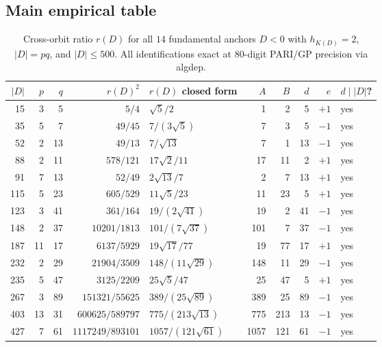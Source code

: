 \documentclass[11pt]{amsart}
\theoremstyle{definition}
\theoremstyle{remark}
\begin{document}
\subsection{Main empirical table}\label{ssec:main-table}

\begin{table}[H]
\centering
\caption{Cross-orbit ratio \(r(D)\) for all \(14\) fundamental
anchors \(D < 0\) with \(h_{K(D)} = 2\), \(|D| = pq\), and
\(|D| \le 500\). All identifications exact at \(80\)-digit
PARI/GP precision via \textsf{algdep}.}\label{tab:main}
\begin{tabular}{rrrrlrrrrl}
\toprule
\(|D|\) & \(p\) & \(q\) & \(r(D)^{2}\) & \(r(D)\) closed form & \(A\) & \(B\) & \(d\) & \(e\) & \(d \mid |D|\)? \\
\midrule
15  & 3  & 5  & \(5/4\)            & \(\sqrt{5}/2\)            & 1    & 2   & 5  & \(+1\) & yes \\
35  & 5  & 7  & \(49/45\)          & \(7/(3\sqrt{5})\)         & 7    & 3   & 5  & \(-1\) & yes \\
52  & 2  & 13 & \(49/13\)          & \(7/\sqrt{13}\)           & 7    & 1   & 13 & \(-1\) & yes \\
88  & 2  & 11 & \(578/121\)        & \(17\sqrt{2}/11\)         & 17   & 11  & 2  & \(+1\) & yes \\
91  & 7  & 13 & \(52/49\)          & \(2\sqrt{13}/7\)          & 2    & 7   & 13 & \(+1\) & yes \\
115 & 5  & 23 & \(605/529\)        & \(11\sqrt{5}/23\)         & 11   & 23  & 5  & \(+1\) & yes \\
123 & 3  & 41 & \(361/164\)        & \(19/(2\sqrt{41})\)       & 19   & 2   & 41 & \(-1\) & yes \\
148 & 2  & 37 & \(10201/1813\)     & \(101/(7\sqrt{37})\)      & 101  & 7   & 37 & \(-1\) & yes \\
187 & 11 & 17 & \(6137/5929\)      & \(19\sqrt{17}/77\)        & 19   & 77  & 17 & \(+1\) & yes \\
232 & 2  & 29 & \(21904/3509\)     & \(148/(11\sqrt{29})\)     & 148  & 11  & 29 & \(-1\) & yes \\
235 & 5  & 47 & \(3125/2209\)      & \(25\sqrt{5}/47\)         & 25   & 47  & 5  & \(+1\) & yes \\
267 & 3  & 89 & \(151321/55625\)   & \(389/(25\sqrt{89})\)     & 389  & 25  & 89 & \(-1\) & yes \\
403 & 13 & 31 & \(600625/589797\)  & \(775/(213\sqrt{13})\)    & 775  & 213 & 13 & \(-1\) & yes \\
427 & 7  & 61 & \(1117249/893101\) & \(1057/(121\sqrt{61})\)   & 1057 & 121 & 61 & \(-1\) & yes \\
\bottomrule
\end{tabular}
\end{table}
\end{document}
